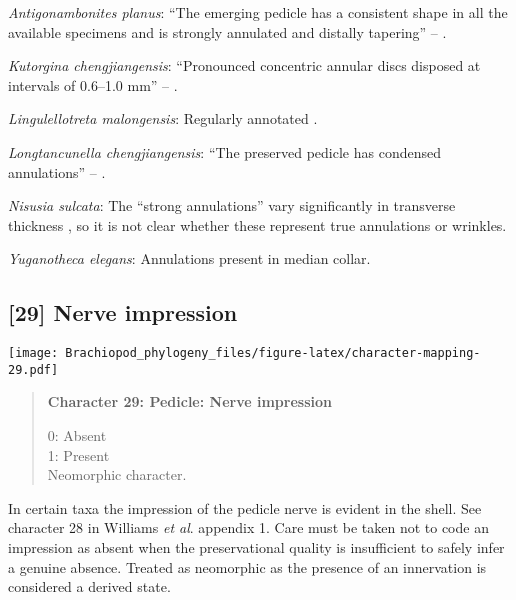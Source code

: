 \documentclass[openany]{book}
\theoremstyle{definition}
\theoremstyle{definition}
\theoremstyle{definition}
\theoremstyle{remark}
\begin{document}
\hypertarget{Antigonambonites_planus-coding-28}{}
\emph{Antigonambonites planus}: ``The emerging pedicle has a consistent
shape in all the available specimens and is strongly annulated and
distally tapering'' -- \citet{Holmer2018Evolutionarysignificance}.

\hypertarget{Kutorgina_chengjiangensis-coding-28}{}
\emph{Kutorgina chengjiangensis}: ``Pronounced concentric annular discs
disposed at intervals of 0.6--1.0 mm'' --
\citet{Zhang2007Rhynchonelliformeanbrachiopods}.

\hypertarget{Lingulellotreta_malongensis-coding-28}{}
\emph{Lingulellotreta malongensis}: Regularly annotated \citep[see fig.
14.9 in][]{Hou2017Brachiopoda}.

\hypertarget{Longtancunella_chengjiangensis-coding-28}{}
\emph{Longtancunella chengjiangensis}: ``The preserved pedicle has
condensed annulations'' -- \citet{Zhang2011Theexceptionally}.

\hypertarget{Nisusia_sulcata-coding-28}{}
\emph{Nisusia sulcata}: The ``strong annulations'' vary significantly in
transverse thickness \citep{Holmer2018Evolutionarysignificance}, so it
is not clear whether these represent true annulations or wrinkles.

\hypertarget{Yuganotheca_elegans-coding-28}{}
\emph{Yuganotheca elegans}: Annulations present in median collar.

\subsection*{{[}29{]} Nerve impression}\label{nerve-impression}

\texttt{[image: Brachiopod\_phylogeny\_files/figure-latex/character-mapping-29.pdf]}

\begin{quote}
\textbf{Character 29: Pedicle: Nerve impression}

0: Absent\\
1: Present\\
Neomorphic character.
\end{quote}

In certain taxa the impression of the pedicle nerve is evident in the
shell. See character 28 in Williams \emph{et al}.
\citeyearpar{Williams1998Thediversity} appendix 1. Care must be taken
not to code an impression as absent when the preservational quality is
insufficient to safely infer a genuine absence. Treated as neomorphic as
the presence of an innervation is considered a derived state.
\end{document}
